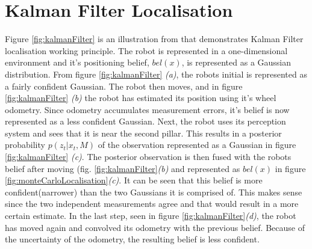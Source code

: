 \appendix

\chapter{Kalman Filter Localisation} \label{A:KalmanFilterLocalisation}
Figure \ref{fig:kalmanFilter} is an illustration from \cite{SiegwartRoland2011Itam} that demonstrates Kalman Filter localisation working principle. The robot is represented in a one-dimensional environment and it's positioning belief, $bel(x)$, is represented as a Gaussian distribution. From figure \ref{fig:kalmanFilter} \textit{(a)}, the robots initial is represented as a fairly confident Gaussian. The robot then moves, and in figure \ref{fig:kalmanFilter} \textit{(b)} the robot has estimated its position using it's wheel odometry. Since odometry accumulates measurement errors, it's belief is now represented as a less confident Gaussian. Next, the robot uses its perception system and sees that it is near the second pillar. This results in a posterior probability $p(z_t | x_t,M)$ of the observation represented as a Gaussian in figure \ref{fig:kalmanFilter} \textit{(c)}. The posterior observation is then fused with the robots belief after moving (fig. \ref{fig:kalmanFilter}\textit{(b)} and represented as $bel(x)$ in figure \ref{fig:monteCarloLocalisation}\textit{(c)}. It can be seen that this belief is more confident(narrower) than the two Gaussians it is comprised of. This makes sense since the two independent measurements agree and that would result in a more certain estimate. In the last step, seen in figure \ref{fig:kalmanFilter}\textit{(d)}, the robot has moved again and convolved its odometry with the previous belief. Because of the uncertainty of the odometry, the resulting belief is less confident.

